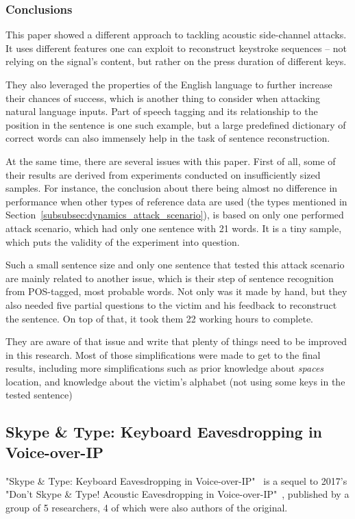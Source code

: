 \documentclass[../main.tex]{subfiles}
\begin{document}
\subsubsection{Conclusions}
This paper showed a different approach to tackling acoustic side-channel attacks. It uses different features one can exploit to reconstruct keystroke sequences -- not relying on the signal's content, but rather on the press duration of different keys. 

They also leveraged the properties of the English language to further increase their chances of success, which is another thing to consider when attacking natural language inputs. Part of speech tagging and its relationship to the position in the sentence is one such example, but a large predefined dictionary of correct words can also immensely help in the task of sentence reconstruction.

At the same time, there are several issues with this paper. First of all, some of their results are derived from experiments conducted on insufficiently sized samples. For instance, the conclusion about there being almost no difference in performance when other types of reference data are used (the types mentioned in Section~\ref{subsubsec:dynamics_attack_scenario}), is based on only one performed attack scenario, which had only one sentence with 21 words. It is a tiny sample, which puts the validity of the experiment into question.

Such a small sentence size and only one sentence that tested this attack scenario are mainly related to another issue, which is their step of sentence recognition from POS-tagged, most probable words. Not only was it made by hand, but they also needed five partial questions to the victim and his feedback to reconstruct the sentence. On top of that, it took them 22 working hours to complete. 

They are aware of that issue and write that plenty of things need to be improved in this research. Most of those simplifications were made to get to the final results, including more simplifications such as prior knowledge about \textit{spaces} location, and knowledge about the victim's alphabet (not using some keys in the tested sentence)

\subsection{Skype \& Type: Keyboard Eavesdropping in Voice-over-IP}
\label{sec:skype_type_keyboard_eavesdtopping_in_voice_over_ip}
"Skype \& Type: Keyboard Eavesdropping in Voice-over-IP"~\cite{skype2019} is a sequel to 2017's "Don't Skype \& Type! Acoustic Eavesdropping in Voice-over-IP"~\cite{skype2017}, published by a group of 5 researchers, 4 of which were also authors of the original.
\end{document}
